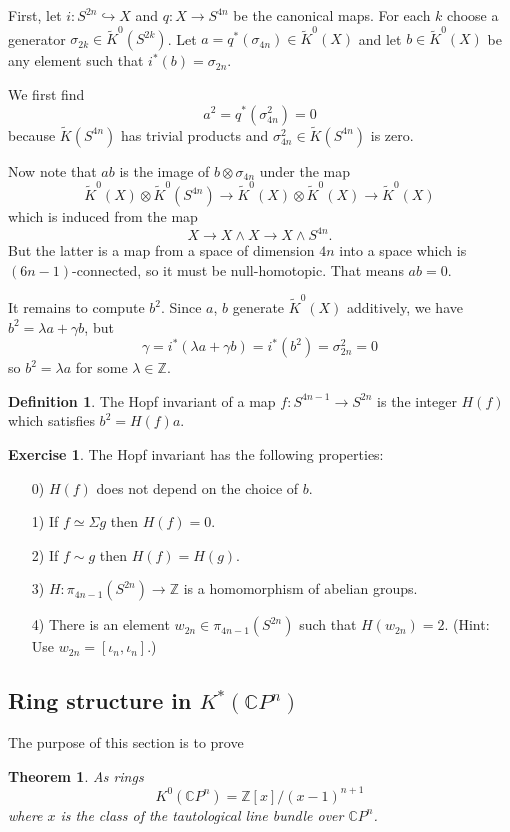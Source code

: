 \documentclass[a4paper,10pt]{article}
\theoremstyle{plain}%
\newtheorem{thm}{Theorem}
\theoremstyle{definition}
\newtheorem{defn}{Definition}
\newtheorem{exer}{Exercise}
\theoremstyle{remark}
\newcommand{\ZZ}{\mathbb{Z}}
\newcommand{\CC}{\mathbb{C}}
\newcommand{\KR}{\widetilde{K}}   %
\newcommand{\cp}{\CC P}   %
\newcommand{\smsh}{\wedge}  %
\newcommand{\susp}{\Sigma}  %
\newcommand{\htpyequiv}{\simeq}  %
\newcommand{\htpic}{\sim}  %
\begin{document}
First, let $i:S^{2n}\hookrightarrow X$ and $q:X\to S^{4n}$ be the canonical maps. For each $k$ choose a generator $\sigma_{2k}\in \KR^0(S^{2k})$. Let $a=q^*(\sigma_{4n})\in\KR^0(X)$ and let $b\in\KR^0(X)$ be any element such that $i^*(b)=\sigma_{2n}$.

We first find
$$a^2=q^*(\sigma_{4n}^2)=0$$
because $\KR(S^{4n})$ has trivial products and $\sigma_{4n}^2\in \KR(S^{4n})$ is zero.

Now note that $ab$ is the image of $b\otimes \sigma_{4n}$ under the map
$$\KR^0(X)\otimes \KR^0(S^{4n})\to \KR^0(X)\otimes \KR^0(X) \to \KR^0(X)$$
which is induced from the map
$$X\to X\smsh X\to X\smsh S^{4n}.$$
But the latter is a map from a space of dimension $4n$ into a space which is $(6n-1)$-connected, so it must be null-homotopic. That means $ab=0$.

It remains to compute $b^2$. Since $a$, $b$ generate $\KR^0(X)$ additively, we have $b^2=\lambda a+\gamma b$, but
$$\gamma=i^*(\lambda a+\gamma b)=i^*(b^2)=\sigma_{2n}^2=0$$
so $b^2=\lambda a$ for some $\lambda\in\ZZ$.

\begin{defn}
The Hopf invariant of a map $f:S^{4n-1}\to S^{2n}$ is the integer $H(f)$ which satisfies $b^2=H(f)a$.
\end{defn}

\begin{exer}
The Hopf invariant has the following properties:
\begin{itemize}
\item[0)] $H(f)$ does not depend on the choice of $b$.
\item[1)] If $f\htpyequiv \susp g$ then $H(f)=0$.
\item[2)] If $f\htpic g$ then $H(f)=H(g)$.
\item[3)] $H:\pi_{4n-1}(S^{2n})\to \ZZ$ is a homomorphism of abelian groups.
\item[4)] There is an element $w_{2n}\in \pi_{4n-1}(S^{2n})$ such that $H(w_{2n})=2$. (Hint: Use $w_{2n}=[\iota_n,\iota_n]$.)
\end{itemize}
\end{exer}


\subsection{Ring structure in $K^*(\cp^n)$}

The purpose of this section is to prove

\begin{thm}
As rings
$$
K^0(\cp^n)=\ZZ[x]/(x-1)^{n+1}
$$
where $x$ is the class of the tautological line bundle over $\cp^n$.
\end{thm}
\end{document}
